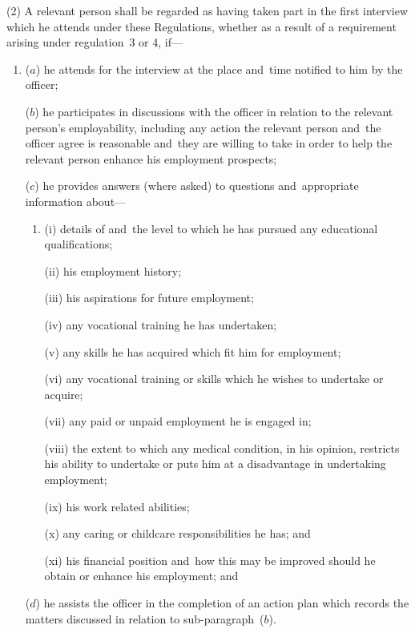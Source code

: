 \documentclass[12pt,a4paper]{article}
\begin{document}
(2) A relevant person shall be regarded as having taken part in the first interview which he attends under these Regulations, whether as a result of a requirement arising under regulation~3 or 4, if—
\begin{enumerate}\item[]
($a$) he attends for the interview at the place and~time notified to him by the officer;

($b$) he participates in discussions with the officer in relation to the relevant person’s employability, including any action the relevant person and~the officer agree is reasonable and~they are willing to take in order to help the relevant person enhance his employment prospects;

($c$) he provides answers (where asked) to questions and~appropriate information about—
\begin{enumerate}\item[]
(i) details of and~the level to which he has pursued any educational qualifications;

(ii) his employment history;

(iii) his aspirations for future employment;

(iv) any vocational training he has undertaken;

(v) any skills he has acquired which fit him for employment;

(vi) any vocational training or skills which he wishes to undertake or acquire;

(vii) any paid or unpaid employment he is engaged in;

(viii) the extent to which any medical condition, in his opinion, restricts his ability to undertake or puts him at a disadvantage in undertaking employment;

(ix) his work related abilities;

(x) any caring or childcare responsibilities he has; and

(xi) his financial position and~how this may be improved should he obtain or enhance his employment; and
\end{enumerate}

($d$) he assists the officer in the completion of an action plan which records the matters discussed in relation to sub-paragraph~($b$).
\end{enumerate}
\end{document}
